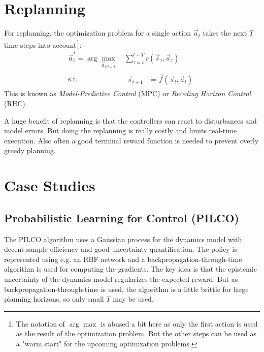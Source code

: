 	\section{Replanning}
		\label{sec:mbrlReplanning}

		For replanning, the optimization problem for a single action \( \vec{a}_t \) takes the next \(T\) time steps into account\footnote{The notation of \(\arg\max\) is abused a bit here as only the first action is used as the result of the optimization problem. But the other steps can be used as a "warm start" for the upcoming optimization problems.}:
		\begin{equation*}
			\begin{aligned}
				\vec{a}_t^\ast = \arg\max_{\vec{a}_{t:t + T}} \, & \sum_{\tau = t}^{t + T} r(\vec{s}_\tau, \vec{a}_\tau) \\
				\mathrm{s.t.} \quad                              &
				\begin{aligned}
					\vec{s}_{t + 1} & = \vec{f}(\vec{s}_t, \vec{a}_t)
				\end{aligned}
			\end{aligned}
		\end{equation*}
		This is known as \emph{Model-Predictive Control} (MPC) or \emph{Receding Horizon Control} (RHC).

		A huge benefit of replanning is that the controllers can react to disturbances and model errors. But doing the replanning is really costly and limits real-time execution. Also often a good terminal reward function is needed to prevent overly greedy planning.

	\section{Case Studies}
		\subsection{Probabilistic Learning for Control (PILCO)}
			The PILCO algorithm uses a Gaussian process for the dynamics model with decent sample efficiency and good uncertainty quantification. The policy is represented using e.g. an RBF network and a backpropagation-through-time algorithm is used for computing the gradients. The key idea is that the epistemic uncertainty of the dynamics model regularizes the expected reward. But as backpropagation-through-time is used, the algorithm is a little brittle for large planning horizons, so only small \(T\) may be used.

